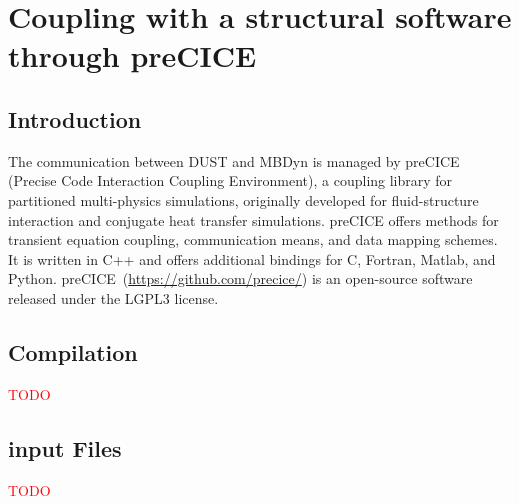 \chapter{Coupling with a structural software through preCICE}
\section{Introduction}
The communication between DUST and MBDyn is managed by preCICE (Precise Code Interaction Coupling Environment), a coupling library for partitioned multi-physics simulations, originally developed for fluid-structure interaction and conjugate heat transfer simulations.
preCICE offers methods for transient equation coupling, communication means, and data mapping schemes. It is written in C++ and offers additional bindings for C, Fortran, Matlab, and Python.
preCICE~(\url{https://github.com/precice/}) is an open-source software released under the LGPL3 license. 

\section{Compilation}
\textcolor{red}{TODO}
\section{input Files}
\textcolor{red}{TODO}
